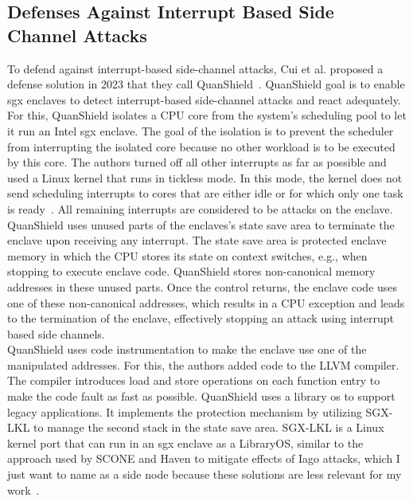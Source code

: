 \subsection{Defenses Against Interrupt Based Side Channel Attacks}
\label{sec:20:mitigations:interrupt_sca}
To defend against interrupt-based side-channel attacks, Cui et al. proposed a
defense solution in 2023 that they call QuanShield~\cite{cui_quanshield_2023}.
QuanShield goal is to enable \gls{sgx} enclaves to detect interrupt-based
side-channel attacks and react adequately. For this, QuanShield isolates a CPU
core from the system's scheduling pool to let it run an Intel \gls{sgx} enclave.
The goal of the isolation is to prevent the scheduler from interrupting the
isolated core because no other workload is to be executed by this core. The
authors turned off all other interrupts as far as possible and used a Linux
kernel that runs in tickless mode. In this mode, the kernel does not send
scheduling interrupts to cores that are either idle or for which only one task
is ready~\cite{linuxtickless}. All remaining interrupts are considered to be
attacks on the enclave. QuanShield uses unused parts of the enclaves's state
save area to terminate the enclave upon receiving any interrupt. The state save
area is protected enclave memory in which the CPU stores its state on context
switches, e.g., when stopping to execute enclave code. QuanShield stores
non-canonical memory addresses in these unused parts. Once the control returns,
the enclave code uses one of these non-canonical addresses, which results in a
CPU exception and leads to the termination of the enclave, effectively stopping
an attack using interrupt based side channels.\\

QuanShield uses code instrumentation to make the enclave use one of the
manipulated addresses. For this, the authors added code to the LLVM compiler.
The compiler introduces load and store operations on each function entry to make
the code fault as fast as possible. QuanShield uses a library \gls{os} to
support legacy applications. It implements the protection mechanism by utilizing
SGX-LKL to manage the second stack in the state save area. SGX-LKL is a Linux
kernel port that can run in an \gls{sgx} enclave as a LibraryOS, similar to the
approach used by SCONE and Haven to mitigate effects of Iago attacks, which I
just want to name as a side node because these solutions are less relevant for
my work~\cite{priebe2019sgx,arnautov_scone_2016,baumann_shielding_2015,
checkoway2013iago}.

